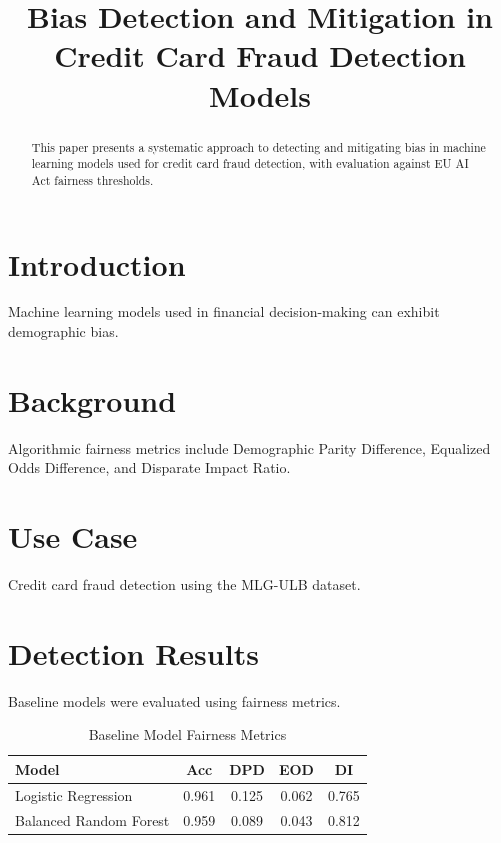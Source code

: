 \documentclass[conference]{IEEEtran}
\begin{document}
\title{Bias Detection and Mitigation in Credit Card Fraud Detection Models}

\author{
}

\maketitle

\begin{abstract}
This paper presents a systematic approach to detecting and mitigating bias in machine learning models used for credit card fraud detection, with evaluation against EU AI Act fairness thresholds.
\end{abstract}

\section{Introduction}
Machine learning models used in financial decision-making can exhibit demographic bias.

\section{Background}
Algorithmic fairness metrics include Demographic Parity Difference, Equalized Odds Difference, and Disparate Impact Ratio.

\section{Use Case}
Credit card fraud detection using the MLG-ULB dataset.

\section{Detection Results}
Baseline models were evaluated using fairness metrics.

\begin{table}[h]
\centering
\caption{Baseline Model Fairness Metrics}
\begin{tabular}{|l|c|c|c|c|}
\hline
Model & Acc & DPD & EOD & DI \\
\hline
Logistic Regression & 0.961 & 0.125 & 0.062 & 0.765 \\
Balanced Random Forest & 0.959 & 0.089 & 0.043 & 0.812 \\
\hline
\end{tabular}
\end{table}
\end{document}
